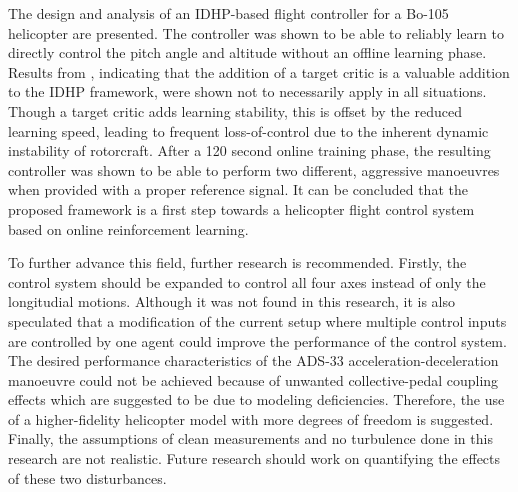 The design and analysis of an IDHP-based flight controller for a Bo-105 helicopter are presented. The controller was shown to be able to reliably learn to directly control the pitch angle and altitude without an offline learning phase. Results from \cite{Heyer2020}, indicating that the addition of a target critic is a valuable addition to the IDHP framework, were shown not to necessarily apply in all situations. Though a target critic adds learning stability, this is offset by the reduced learning speed, leading to frequent loss-of-control due to the inherent dynamic instability of rotorcraft. After a 120 second online training phase, the resulting controller was shown to be able to perform two different, aggressive manoeuvres when provided with a proper reference signal.  It can be concluded that the proposed framework is a first step towards a helicopter flight control system based on online reinforcement learning.

To further advance this field, further research is recommended. Firstly, the control system should be expanded to control all four axes instead of only the longitudial motions. Although it was not found in this research, it is also speculated that a modification of the current setup where multiple control inputs are controlled by one agent could improve the performance of the control system.  The desired performance characteristics of the ADS-33 acceleration-deceleration manoeuvre could not be achieved because of unwanted collective-pedal coupling effects which are suggested to be due to modeling deficiencies. Therefore, the use of a higher-fidelity helicopter model with more degrees of freedom is suggested. Finally, the assumptions of clean measurements and no turbulence done in this research are not realistic. Future research should work on quantifying the effects of these two disturbances. 